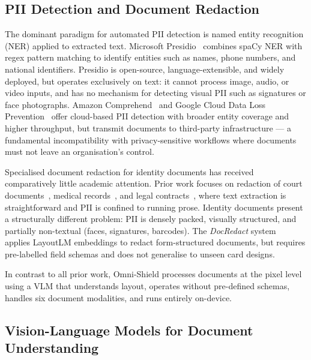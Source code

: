 \documentclass[conference]{IEEEtran}
\begin{document}
\subsection{PII Detection and Document Redaction}

The dominant paradigm for automated PII detection is
named entity recognition (NER) applied to extracted text.
Microsoft Presidio~\cite{presidio2020} combines spaCy
NER with regex pattern matching to identify entities
such as names, phone numbers, and national identifiers.
Presidio is open-source, language-extensible, and widely
deployed, but operates exclusively on text: it cannot
process image, audio, or video inputs, and has no
mechanism for detecting visual PII such as signatures
or face photographs.
Amazon Comprehend~\cite{aws_comprehend} and Google Cloud
Data Loss Prevention~\cite{google_dlp} offer cloud-based
PII detection with broader entity coverage and higher
throughput, but transmit documents to third-party
infrastructure --- a fundamental incompatibility with
privacy-sensitive workflows where documents must not
leave an organisation's control.

Specialised document redaction for identity documents
has received comparatively little academic attention.
Prior work focuses on redaction of court
documents~\cite{berg2020}, medical records~\cite{stubbs2015},
and legal contracts~\cite{manor2019}, where text
extraction is straightforward and PII is confined to
running prose.
Identity documents present a structurally different
problem: PII is densely packed, visually structured,
and partially non-textual (faces, signatures, barcodes).
The \textit{DocRedact} system~\cite{ferrando2022} applies
LayoutLM embeddings to redact form-structured documents,
but requires pre-labelled field schemas and does not
generalise to unseen card designs.

In contrast to all prior work, Omni-Shield processes
documents at the pixel level using a VLM that
understands layout, operates without pre-defined schemas,
handles six document modalities, and runs entirely
on-device.

\subsection{Vision-Language Models for Document
            Understanding}
\end{document}
